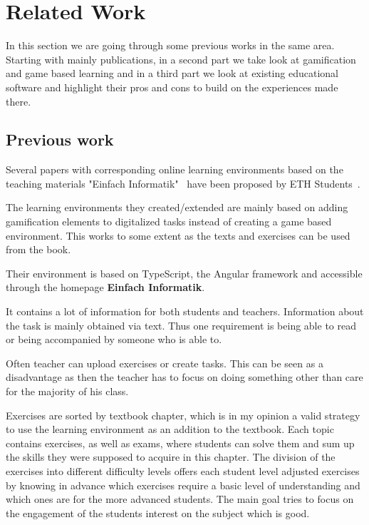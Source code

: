 
\setcounter{chapter}{1}

\chapter{Related Work}\label{ch:relatedwork}
In this section we are going through some previous works in the same area.
Starting with mainly publications, in a second part we take look at gamification
and game based learning and in a third part we look at existing educational software
and highlight their pros and cons to build on the experiences made there.

\section{Previous work}\label{sec:previous-work}
Several papers with corresponding online learning environments based on the teaching materials "Einfach Informatik"\
\cite{ei56, ei79dat, ei79strat} have been proposed by ETH Students\ \cite{stblum, skamp, tangk, jweber}.

The learning environments they created/extended are mainly based on adding gamification elements to digitalized tasks
instead of creating a game based environment.
This works to some extent as the texts and exercises can be used from the book.

Their environment is based on TypeScript, the Angular framework and accessible through the homepage \textbf{Einfach Informatik}\cite{einfachinformatik}.

It contains a lot of information for both students and teachers.
Information about the task is mainly obtained via text.
Thus one requirement is being able to read or being accompanied by someone who is able to.

Often teacher can upload exercises or create tasks.
This can be seen as a disadvantage as then the teacher has to focus on doing something other than care for the majority
of his class.

Exercises are sorted by textbook chapter, which is in my opinion a valid strategy to use the learning environment as an
addition to the textbook.
Each topic contains exercises, as well as exams, where students can solve
them and sum up the skills they were supposed to acquire in this chapter.
The division of the exercises into different difficulty levels offers each student level adjusted exercises by knowing
in advance which exercises require a basic level of understanding and which ones are for the more advanced students.
The main goal tries to focus on the engagement of the students interest on the subject which is good.

